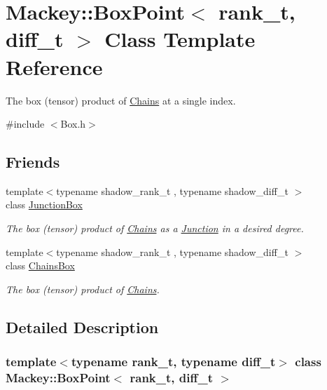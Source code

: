 \hypertarget{classMackey_1_1BoxPoint}{}\section{Mackey\+:\+:Box\+Point$<$ rank\+\_\+t, diff\+\_\+t $>$ Class Template Reference}
\label{classMackey_1_1BoxPoint}


The box (tensor) product of \hyperlink{classMackey_1_1Chains}{Chains} at a single index.  




{\ttfamily \#include $<$Box.\+h$>$}

\subsection*{Friends}
\begin{DoxyCompactItemize}
\item 
{\footnotesize template$<$typename shadow\+\_\+rank\+\_\+t , typename shadow\+\_\+diff\+\_\+t $>$ }\\class \hyperlink{classMackey_1_1BoxPoint_aa6b9506519f57502db8432843a492fd1}{Junction\+Box}
\begin{DoxyCompactList}\small\item\em The box (tensor) product of \hyperlink{classMackey_1_1Chains}{Chains} as a \hyperlink{classMackey_1_1Junction}{Junction} in a desired degree. \end{DoxyCompactList}\item 
{\footnotesize template$<$typename shadow\+\_\+rank\+\_\+t , typename shadow\+\_\+diff\+\_\+t $>$ }\\class \hyperlink{classMackey_1_1BoxPoint_ac5da7907baad1a7469bb064b08228610}{Chains\+Box}
\begin{DoxyCompactList}\small\item\em The box (tensor) product of \hyperlink{classMackey_1_1Chains}{Chains}. \end{DoxyCompactList}\end{DoxyCompactItemize}


\subsection{Detailed Description}
\subsubsection*{template$<$typename rank\+\_\+t, typename diff\+\_\+t$>$\newline
class Mackey\+::\+Box\+Point$<$ rank\+\_\+t, diff\+\_\+t $>$}


